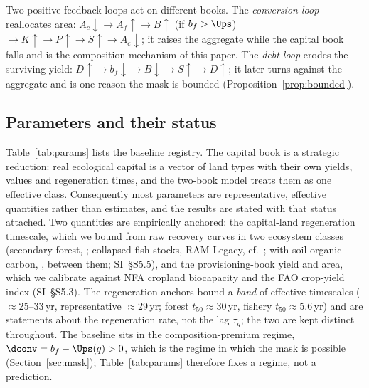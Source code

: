 Two positive feedback loops act on different books. The \emph{conversion loop} reallocates area: $A_c\downarrow\to A_f\uparrow\to B\uparrow$ (if $b_f>\Ups$) $\to K\uparrow\to P\uparrow\to S\uparrow\to A_c\downarrow$; it raises the aggregate while the capital book falls and is the composition mechanism of this paper. The \emph{debt loop} erodes the surviving yield: $D\uparrow\to b_f\downarrow\to B\downarrow\to S\uparrow\to D\uparrow$; it later turns against the aggregate and is one reason the mask is bounded (Proposition~\ref{prop:bounded}).

\subsection{Parameters and their status}\label{sec:params}

Table~\ref{tab:params} lists the baseline registry. The capital book is a strategic reduction: real ecological capital is a vector of land types with their own yields, values and regeneration times, and the two-book model treats them as one effective class. Consequently most parameters are representative, effective quantities rather than estimates, and the results are stated with that status attached. Two quantities are empirically anchored: the capital-land regeneration timescale, which we bound from raw recovery curves in two ecosystem classes (secondary forest, \citealp{Poorter2016}; collapsed fish stocks, RAM Legacy, cf.\ \citealp{HutchingsReynolds2004,Neubauer2013}; with soil organic carbon, \citealp{Poeplau2011}, between them; SI~\S S5.5), and the provisioning-book yield and area, which we calibrate against NFA cropland biocapacity and the FAO crop-yield index (SI~\S S5.3). The regeneration anchors bound a \emph{band} of effective timescales ($\approx$25--33\,yr, representative $\approx$29\,yr; forest $t_{50}\approx30$\,yr, fishery $t_{50}\approx5.6$\,yr) and are statements about the regeneration rate, not the lag $\tau_g$; the two are kept distinct throughout. The baseline sits in the composition-premium regime, $\dconv=b_f-\Ups(q)>0$, which is the regime in which the mask is possible (Section~\ref{sec:mask}); Table~\ref{tab:params} therefore fixes a regime, not a prediction.

